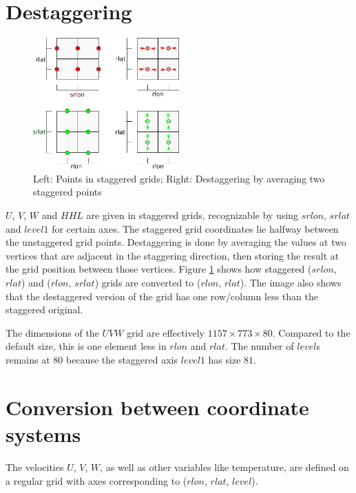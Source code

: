 \section{Destaggering}\label{sec:destaggering}
\begin{figure}
\centering \includegraphics*[width=0.5\textwidth]{figures/0613_staggering}
\caption{Left: Points in staggered grids; Right: Destaggering by averaging two staggered points}
\label{fig:destaggering}
\end{figure}
$U$, $V$, $W$ and $HHL$ are given in staggered grids, recognizable by using $srlon$, $srlat$ and $level1$ for certain axes. The staggered grid coordinates lie halfway between the unstaggered grid points. Destaggering is done by averaging the values at two vertices that are adjacent in the staggering direction, then storing the result at the grid position between those vertices. Figure \ref{fig:destaggering} shows how staggered ($srlon$, $rlat$) and ($rlon$, $srlat$) grids are converted to ($rlon$, $rlat$). The image also shows that the destaggered version of the grid has one row/column less than the staggered original.

The dimensions of the $UVW$ grid are effectively $1157 \times 773 \times 80$. Compared to the default size, this is one element less in $rlon$ and $rlat$. The number of $level$s remains at $80$ because the staggered axis $level1$ has size $81$.

\section{Conversion between coordinate systems}\label{sec:conversion}
The velocities $U$, $V$, $W$, as well as other variables like temperature, are defined on a regular grid with axes corresponding to ($rlon$, $rlat$, $level$).

